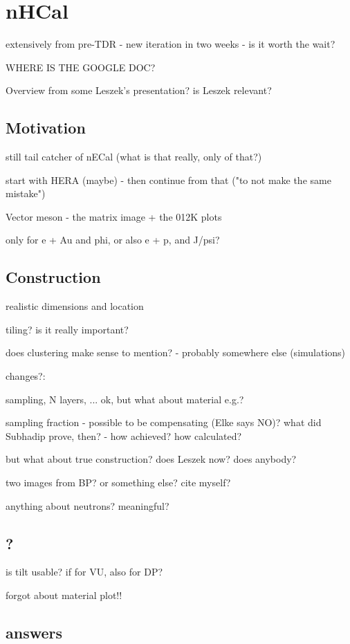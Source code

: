 \chapter{nHCal}\label{cha:nHCal} %
extensively from pre-TDR - new iteration in two weeks - is it worth the wait?

WHERE IS THE GOOGLE DOC? 

Overview from some Leszek's presentation? is Leszek relevant?

\section{Motivation}
still tail catcher of nECal (what is that really, only of that?)

start with HERA (maybe) - then continue from that ("to not make the same mistake")

Vector meson - the matrix image + the 012K plots

only for e + Au and phi, or also e + p, and J/psi?

\section{Construction}
realistic dimensions and location

tiling? is it really important?

does clustering make sense to mention? - probably somewhere else (simulations)

changes?:

sampling, N layers, ... ok, but what about material e.g.?

sampling fraction - possible to be compensating (Elke says NO)? what did Subhadip prove, then? - how achieved? how calculated?

but what about true construction? does Leszek now? does anybody?

two images from BP? or something else? cite myself?

anything about neutrons? meaningful?

\section{?}
is tilt usable? if for VU, also for DP?

forgot about material plot!!

\section{answers}

